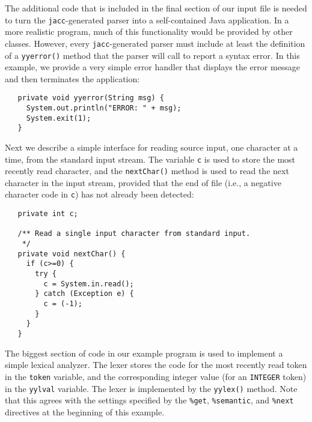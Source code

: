 \documentclass[12pt]{article}
\def\jacc{{\tt jacc}}
\begin{document}
The additional code that is included in the final section of our
input file is needed to turn the \jacc-generated parser into a
self-contained Java application.  In a more realistic program,
much of this functionality would be provided by other classes.
However, every \jacc-generated parser must include at least the
definition of a \verb"yyerror()" method that the parser will
call to report a syntax error.  In this example, we provide a
very simple error handler that displays the error message and
then terminates the application:
{\small
\begin{verbatim}
   private void yyerror(String msg) {
     System.out.println("ERROR: " + msg);
     System.exit(1);
   }
\end{verbatim}
}%
Next we describe a simple interface for reading source input,
one character at a time, from the standard input stream.  The
variable \verb"c" is used to store the most recently read
character, and the \verb"nextChar()" method is used to read
the next character in the input stream, provided that the
end of file (i.e., a negative character code in \verb"c")
has not already been detected:
{\small
\begin{verbatim}
   private int c;

   /** Read a single input character from standard input.
    */
   private void nextChar() {
     if (c>=0) {
       try {
         c = System.in.read();
       } catch (Exception e) {
         c = (-1);
       }
     }
   }
\end{verbatim}
}%
The biggest section of code in our example program is used
to implement a simple lexical analyzer.  The lexer stores the
code for the most recently read token in the \verb"token"
variable, and the corresponding integer value (for an
\verb"INTEGER" token) in the \verb"yylval" variable.  The
lexer is implemented by the \verb"yylex()" method.  Note that
this agrees with the settings specified by the \verb"%get",
\verb"%semantic", and \verb"%next" directives at the beginning
of this example.
\end{document}
